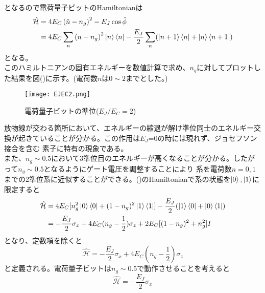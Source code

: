         となるので電荷量子ビットのHamiltonianは
        \begin{equation}\begin{aligned}
            \hat{\mathcal{H}} &=4 E_{C}\left(\hat{n}-n_{g}\right)^{2}-E_{J} \cos \hat{\phi} \\
            &=4 E_{C} \sum_{n}\left(n-n_{g}\right)^{2}\ket{n}\bra{n}-\frac{E_{J}}{2} \sum_{n}(\ket{n+1}\bra{n}+\ket{n}\bra{n+1})
            \end{aligned}\end{equation}
        となる。\\
        このハミルトニアンの固有エネルギーを数値計算で求め、$n_g$に対してプロットした結果を図()に示す。(電荷数$n$は$0\sim 2$までとした。)
        \begin{figure}[H]
            \begin{center}
                \texttt{[image: EJEC2.png]}
                \caption{電荷量子ビットの準位($E_J/E_C=2$)}
            \end{center}
        \end{figure}
        放物線が交わる箇所において、エネルギーの縮退が解け準位同士のエネルギー交換が起きていることが分かる。この作用は$E_J$=0の時には現れず、ジョセフソン接合を含む
        素子に特有の現象である。\\
        また、$n_g \sim 0.5$において3準位目のエネルギーが高くなることが分かる。したがって$n_g \sim 0.5$となるようにゲート電圧を調整することにより
        系を電荷数$n=0,1$までの2準位系に近似することができる。()のHamiltonianで系の状態を$\ket{0},\ket{1}$に限定すると
        \begin{equation}
            \begin{aligned}
            \hat{\mathcal{H}}&=4E_C[ n_g^2 \ket{0} \bra{0} + (1-n_g)^2 \ket{1} \bra{1}]-\frac{E_J}{2}(\ket{1} \bra{0}+\ket{0} \bra{1})\\
            &=-\frac{E_J}{2}\sigma_x + 4E_C(n_g-\frac{1}{2})\sigma_z + 2E_C [(1-n_g)^2+n_g^2] I
            \end{aligned}
        \end{equation}
        となり、定数項を除くと
        \begin{equation}
            \hat{\mathcal{H}}=-\frac{E_J}{2}\sigma_x + 4E_C ( n_g-\frac{1}{2} ) \sigma_z
        \end{equation}
        と定義される。電荷量子ビットは$n_g \sim 0.5$で動作させることを考えると
        \begin{equation}
            \hat{\mathcal{H}}=-\frac{E_J}{2}\sigma_x
        \end{equation}
